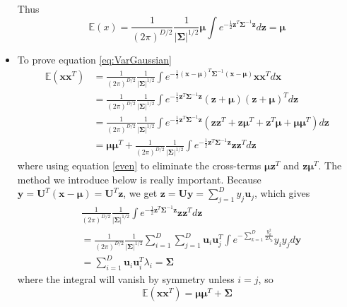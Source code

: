 \documentclass[12pt, a4paper]{article}
\begin{document}
\begin{itemize}
        Thus
        \begin{equation}
            \mathbb{E}(x)=\frac{1}{(2\pi)^{D/2}}\frac{1}{\vert\bm{\Sigma}\vert^{1/2}}\bm{\mu}
            \int e^{-\frac{1}{2}\bm{z}^T\bm{\Sigma}^{-1}\bm{z}}d\bm{z}=\bm{\mu}
        \end{equation}
        \item To prove equation \ref{eq:VarGaussian}
        \begin{align}
            \mathbb{E}(\bm{x}\bm{x}^T)&=\frac{1}{(2\pi)^{D/2}}\frac{1}{\vert
            \bm{\Sigma}\vert^{1/2}}\int e^{-\frac{1}{2}(\bm{x}-\bm{\mu})^T\bm{\Sigma}^{-1}
            (\bm{x}-\bm{\mu})}\bm{x}\bm{x}^Td\bm{x}\nonumber\\
            &=\frac{1}{(2\pi)^{D/2}}\frac{1}{\vert\bm{\Sigma}\vert^{1/2}}\int e^{-\frac{1}{2}
            \bm{z}^T\bm{\Sigma}^{-1}\bm{z}}(\bm{z}+\bm{\mu})(\bm{z}+\bm{\mu})^Td\bm{z}\nonumber\\
            &=\frac{1}{(2\pi)^{D/2}}\frac{1}{\vert\bm{\Sigma}\vert^{1/2}}\int e^{-\frac{1}{2}
            \bm{z}^T\bm{\Sigma}^{-1}\bm{z}}(\bm{z}\bm{z}^T+\bm{z}\bm{\mu}^T+\bm{z}^T\bm{\mu}+
            \bm{\mu}\bm{\mu}^T)d\bm{z}\nonumber\\
            &=\bm{\mu}\bm{\mu}^T+\frac{1}{(2\pi)^{D/2}}\frac{1}{\vert\bm{\Sigma}\vert^{1/2}}\int 
            e^{-\frac{1}{2}\bm{z}^T\bm{\Sigma}^{-1}\bm{z}}\bm{z}\bm{z}^Td\bm{z}
        \end{align}
        where using equation \ref{even} to eliminate the cross-terms $\bm{\mu}\bm{z}^T$ and 
        $\bm{z}\bm{\mu}^T$. The method we introduce below is really important. 
        Because $\bm{y}=\bm{U}^T(\bm{x}-\bm{\mu})=\bm{U}^T\bm{z}$, we get
        $\bm{z}=\bm{U}\bm{y}=\sum_{j=1}^Dy_j\bm{u}_j$, which gives
        \begin{align*}
            &\frac{1}{(2\pi)^{D/2}}\frac{1}{\vert\bm{\Sigma}\vert^{1/2}}\int 
            e^{-\frac{1}{2}\bm{z}^T\bm{\Sigma}^{-1}\bm{z}}\bm{z}\bm{z}^Td\bm{z}\\
            &=\frac{1}{(2\pi)^{D/2}}\frac{1}{\vert\bm{\Sigma}\vert^{1/2}} \sum_{i=1}^D\sum_{j=1}^D
            \bm{u}_i\bm{u}_j^T\int e^{-\sum_{k=1}^D\frac{y_k^2}{2\lambda_k}}y_iy_jd\bm{y}\\
            &=\sum_{i=1}^D\bm{u}_i\bm{u}_i^T\lambda_i=\bm{\Sigma}
        \end{align*}
        where the integral will vanish by symmetry unless $i=j$, so
        \begin{equation}
            \mathbb{E}(\bm{x}\bm{x}^T)=\bm{\mu}\bm{\mu}^T+\bm{\Sigma}

\end{equation}
\end{itemize}
\end{document}
